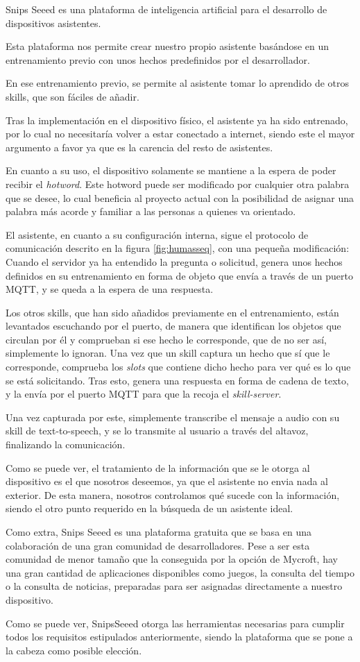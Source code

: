 Snips Seeed es una  plataforma de inteligencia artificial para el desarrollo de dispositivos asistentes.

Esta plataforma nos permite crear nuestro propio asistente basándose en un entrenamiento previo con unos hechos predefinidos por el desarrollador.

En ese entrenamiento previo, se permite al asistente tomar lo aprendido de otros skills, que son fáciles de añadir.

Tras la implementación en el dispositivo físico, el asistente ya ha sido entrenado, por lo cual no necesitaría volver a estar conectado a internet, siendo este el mayor argumento a favor ya que es la carencia del resto de asistentes.

En cuanto a su uso, el dispositivo solamente se mantiene a la espera de poder recibir el \textit{hotword}. Este hotword puede ser modificado por cualquier otra palabra que se desee, lo cual beneficia al proyecto actual con la posibilidad de asignar una palabra más acorde y familiar a las personas a quienes va orientado.

El asistente, en cuanto a su configuración interna, sigue el protocolo de comunicación descrito en la figura \ref{fig:humasseq}, con una pequeña modificación:
Cuando el servidor ya ha entendido la pregunta o solicitud, genera unos hechos definidos en su entrenamiento en forma de objeto que envía a través de un puerto MQTT, y se queda a la espera de una respuesta.

Los otros skills, que han sido añadidos previamente en el entrenamiento, están levantados escuchando por el puerto, de manera que identifican los objetos que circulan por él y comprueban si ese hecho le corresponde, que de no ser así, simplemente lo ignoran.
Una vez que un skill captura un hecho que sí que le corresponde, comprueba los \textit{slots} que contiene dicho hecho para ver qué es lo que se está solicitando. Tras esto, genera una respuesta en forma de cadena de texto, y la envía por el puerto MQTT para que la recoja el \textit{skill-server}.

Una vez capturada por este, simplemente transcribe el mensaje a audio con su skill de text-to-speech, y se lo transmite al usuario a través del altavoz, finalizando la comunicación.

Como se puede ver, el tratamiento de la información que se le otorga al dispositivo es el que nosotros deseemos, ya que el asistente no envia nada al exterior. De esta manera, nosotros controlamos qué sucede con la información, siendo el otro punto requerido en la búsqueda de un asistente ideal.

Como extra, Snips Seeed es una plataforma gratuita que se basa en una colaboración de una gran comunidad de desarrolladores. Pese a ser esta comunidad de menor tamaño que la conseguida por la opción de Mycroft, hay una gran cantidad de aplicaciones disponibles como juegos, la consulta del tiempo o la consulta de noticias, preparadas para ser asignadas directamente a nuestro dispositivo.

Como se puede ver, SnipsSeeed otorga las herramientas necesarias para cumplir todos los requisitos estipulados anteriormente, siendo la plataforma que se pone a la cabeza como posible elección.
